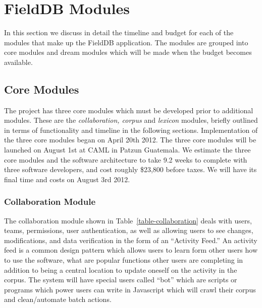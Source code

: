 \documentclass[12 pt]{article}
\begin{document}
\appendix 

\section{FieldDB Modules}

In this section we discuss in detail the timeline and budget for each of the modules that make up the FieldDB application. The modules are grouped into core modules and dream modules which will be made when the budget becomes available. 

\label{sec:modules}
\subsection{Core Modules}

The project has three core modules which must be developed prior to additional modules. These are the {\it collaboration, corpus} and {\it lexicon} modules, briefly outlined in terms of functionality and timeline in the following sections.  Implementation of the three core modules began on April 20th 2012. The three core modules will be launched on August 1st at CAML in Patzun Guatemala. We estimate the three core modules and the software architecture to take 9.2 weeks to complete with three software developers,  and cost roughly \$23,800 before taxes. We will have its final time and costs on August 3rd 2012.


\newpage
\subsubsection{Collaboration Module}
The collaboration module shown in Table~\ref{table-collaboration}  deals with users, teams, permissions, user authentication,  as well as allowing users to see changes, modifications, and data verification in the form of an ``Activity Feed.'' An activity feed is a common design pattern which allows users to learn form other users how to use the software, what are popular functions other users are completing in addition to being a central location to update oneself on the activity in the corpus. The system will have special users called ``bot'' which are scripts or programs which power users can write in Javascript which will crawl their corpus and clean/automate batch actions.
\end{document}
